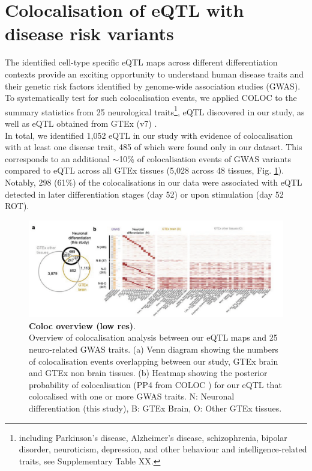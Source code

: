 \clearpage

\section{Colocalisation of eQTL with disease risk variants}
\label{sec:neuroseq_coloc}

The identified cell-type specific eQTL maps across different differentiation contexts provide an exciting opportunity to understand human disease traits and their genetic risk factors identified by genome-wide association studies (GWAS). 
To systematically test for such colocalisation events, we applied COLOC \cite{giambartolomei2014bayesian} to the summary statistics from 25 neurological traits\footnote{including Parkinson's disease, Alzheimer's disease, schizophrenia, bipolar disorder, neuroticism, depression, and other behaviour and intelligence-related traits, see Supplementary Table XX.}, eQTL discovered in our study, as well as eQTL obtained from GTEx (v7) \cite{gtex2017genetic}.\\

In total, we identified 1,052 eQTL in our study with evidence of colocalisation with at least one disease trait, 485 of which were found only in our dataset. 
This corresponds to an additional $\sim$10\% of colocalisation events of GWAS variants compared to eQTL across all GTEx tissues (5,028 across 48 tissues, Fig. \ref{fig:neuroseq_coloc_overview}). 
Notably, 298 (61\%) of the colocalisations in our data were associated with eQTL detected in later differentiation stages (day 52) or upon stimulation (day 52 ROT).\\

\begin{figure}[h]
\centering
\includegraphics[width=16cm]{Chapter5/Fig/neuroseq_coloc_overview.png}
\caption[Coloc overview]{\textbf{Coloc overview (low res)}.\\
Overview of colocalisation analysis between our eQTL maps and 25 neuro-related GWAS traits. 
(a) Venn diagram showing the numbers of colocalisation events overlapping between our study, GTEx brain and GTEx non brain tissues. 
(b) Heatmap showing the posterior probability of colocalisation (PP4 from COLOC \cite{giambartolomei2014bayesian}) for our eQTL that colocalised with one or more GWAS traits. 
N: Neuronal differentiation (this study), B: GTEx Brain, O: Other GTEx tissues.}
\label{fig:neuroseq_coloc_overview}
\end{figure}

